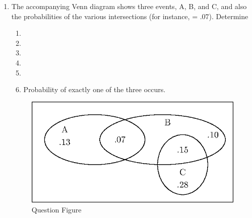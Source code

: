 \begin{enumerate}[label=\thesection.\arabic*,ref=\thesection.\theenumi]
	\item The accompanying Venn diagram shows three events, A, B, and C, and also the probabilities of the various intersections (for instance,  = .07). Determine
\begin{enumerate}
\item 
{}
\item 
{}
\item 
{}
\item 
{}
\item 
{}
\item 
Probability of exactly one
of the three occurs.
\end{enumerate}
\begin{figure}[h!]
	\centering
	\includegraphics[width = \columnwidth]{exemplar/11/16/3/11/figs/new-figure0}
\caption{Question Figure}
\label{fig:exemplar/11/16/3/11/Venn_Diagram}
\end{figure}
		\solution
		
\end{enumerate}
